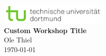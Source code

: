 \begin{titlepage}
    \centering
    \includegraphics[width=0.4\textwidth]{tu.png}\\[1cm]
    {\Huge\bfseries Custom Workshop Title}\\[0.5cm]
    {\large Ole Thiel}\\[0.5cm]
    {\today}
\end{titlepage}
